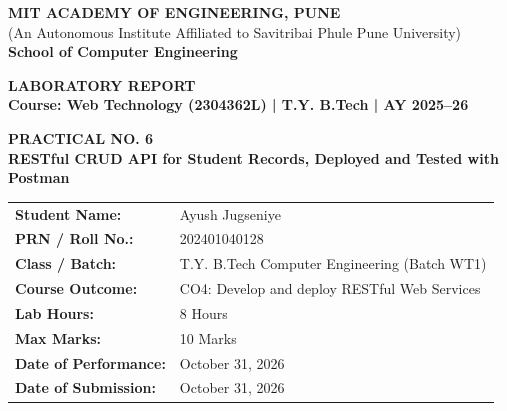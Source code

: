\documentclass[11pt,a4paper]{article}
\begin{document}
\begin{titlepage}
    \centering
    \vspace*{0.5cm}
    
    {\Large \textbf{MIT ACADEMY OF ENGINEERING, PUNE}}\\[0.2cm]
    {\large (An Autonomous Institute Affiliated to Savitribai Phule Pune University)}\\[0.2cm]
    {\textbf{School of Computer Engineering}}\\[1.2cm]
    
    \begin{tcolorbox}[colback=collegeblue,colframe=collegeblue,arc=3mm,width=\textwidth,halign=center]
        \vspace{0.3cm}
        {\LARGE \color{white} \textbf{LABORATORY REPORT}}\\[0.3cm]
        {\large \color{accentamber} \textbf{Course: Web Technology (2304362L) | T.Y. B.Tech | AY 2025--26}}
        \vspace{0.3cm}
    \end{tcolorbox}
    
    \vspace{1.2cm}
    
    {\Large \textbf{PRACTICAL NO. 6}}\\[0.4cm]
    {\LARGE \textbf{RESTful CRUD API for Student Records, Deployed and Tested with Postman}}\\[1.5cm]
    
    \begin{minipage}{0.85\textwidth}
        \begin{tabular}{ll}
            \textbf{Student Name:} & Ayush Jugseniye \\
            \textbf{PRN / Roll No.:} & 202401040128 \\
            \textbf{Class / Batch:} & T.Y. B.Tech Computer Engineering (Batch WT1) \\
            \textbf{Course Outcome:} & CO4: Develop and deploy RESTful Web Services \\
            \textbf{Lab Hours:} & 8 Hours \\
            \textbf{Max Marks:} & 10 Marks \\
            \textbf{Date of Performance:} & October 31, 2026 \\
            \textbf{Date of Submission:} & October 31, 2026 \\
        \end{tabular}
    \end{minipage}
    

    
\end{titlepage}
\end{document}

